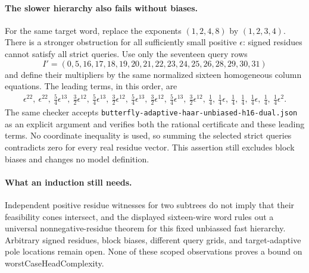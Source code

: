 \documentclass[11pt]{article}
\begin{document}
\paragraph{The slower hierarchy also fails without biases.}
For the same target word, replace the exponents $(1,2,4,8)$ by
$(1,2,3,4)$. There is a stronger obstruction for all sufficiently small
positive $\epsilon$: signed residues cannot satisfy all strict queries.
Use only the seventeen query rows
\[
 I'=(0,5,16,17,18,19,20,21,22,23,24,25,26,28,29,30,31)
\]
and define their multipliers by the same normalized sixteen homogeneous
column equations. The leading terms, in this order, are
\[
\begin{gathered}
 \epsilon^{22},\ \epsilon^{22},\
 \tfrac54\epsilon^{13},\ \tfrac32\epsilon^{12},\
 \tfrac54\epsilon^{13},\ \tfrac32\epsilon^{12},\
 \tfrac54\epsilon^{13},\ \tfrac32\epsilon^{12},\
 \tfrac54\epsilon^{13},\ \tfrac32\epsilon^{12},\
 \tfrac14,\ \tfrac14\epsilon,\ \tfrac14,\ \tfrac14,\
 \tfrac14\epsilon,\ \tfrac14,\ \tfrac14\epsilon^2.
\end{gathered}
\]
The same checker accepts
\texttt{butterfly-adaptive-haar-unbiased-h16-dual.json} as an explicit
argument and verifies both the rational certificate and these leading
terms. No coordinate inequality is used, so summing the selected strict
queries contradicts zero for every real residue vector. This assertion
still excludes block biases and changes no model definition.

\paragraph{What an induction still needs.}
Independent positive residue witnesses for two subtrees do not imply
that their feasibility cones intersect, and the displayed sixteen-wire
word rules out a universal nonnegative-residue theorem for this fixed
unbiassed fast hierarchy. Arbitrary signed residues, block biases,
different query grids, and target-adaptive pole locations remain open.
None of these scoped observations proves a bound on
worstCaseHeadComplexity.
\end{document}
